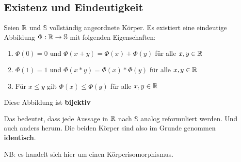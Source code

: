 \documentclass[main.tex]{subfiles}
\begin{document}
\subsection{Existenz und Eindeutigkeit}

\begin{Theorem}
  Seien $\mathbb{R}$ und $\mathbb{S}$ vollständig angeordnete Körper. Es existiert eine eindeutige Abbildung $\Phi: \mathbb{R} \to \mathbb{S}$ mit folgenden Eigenschaften:
  \begin{enumerate}
    \item $\Phi(0) = 0$ und $\Phi (x+y) = \Phi(x) + \Phi(y)$ für alle $x,y \in \mathbb{R}$
    \item $\Phi(1) = 1$ und $\Phi (x*y) = \Phi(x) * \Phi(y)$ für alle $x,y \in \mathbb{R}$
    \item Für $x \leq y$ gilt $\Phi(x) \leq \Phi(y)$ für alle $x,y \in \mathbb{R}$
  \end{enumerate}
  Diese Abbildung ist \textbf{bijektiv}
\end{Theorem}
\begin{Bemerkung}
  Das bedeutet, dass jede Aussage in $\mathbb{R}$ nach $\mathbb{S}$ analog reformuliert werden. Und auch anders herum. Die beiden Körper sind also im Grunde genommen \textbf{identisch}.

  NB: es handelt sich hier um einen Körperisomorphismus.
\end{Bemerkung}
\end{document}
